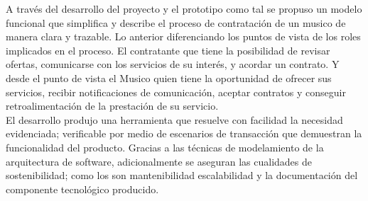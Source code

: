 

A través del desarrollo del proyecto y el prototipo como tal se propuso un modelo funcional que simplifica y describe el proceso de contratación de un musico de manera clara y trazable. Lo anterior diferenciando los puntos de vista de los roles implicados en el proceso. El contratante que tiene la posibilidad de revisar ofertas, comunicarse con los servicios de su interés, y acordar un contrato. Y desde el punto de vista el Musico quien tiene la oportunidad de ofrecer sus servicios, recibir notificaciones de comunicación, aceptar contratos y conseguir retroalimentación de la prestación de su servicio.\\


El desarrollo produjo una herramienta que resuelve con facilidad la necesidad evidenciada; verificable por medio de escenarios de transacción que demuestran la funcionalidad del producto. Gracias a las técnicas de modelamiento de la arquitectura de software, adicionalmente se aseguran las cualidades de sostenibilidad; como los son mantenibilidad escalabilidad y la documentación del componente tecnológico producido.
